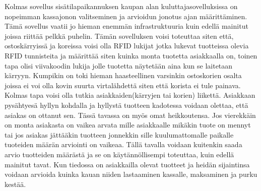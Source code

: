 Kolmas sovellus sisätilapaikannuksen kaupan alan kuluttajasovelluksissa on nopeimman kassajonon valitseminen ja arvioidun jonotus ajan määrittäminen. Tämä sovellus vaatii jo hieman enemmän infrastruktuuria kuin edellä mainitut joissa riittää pelkkä puhelin. Tämän sovelluksen voisi toteuttaa siten että, ostoskärryissä ja koreissa voisi olla RFID lukijat jotka lukevat tuotteissa olevia RFID tunnisteita ja määrittää siten kuinka monta tuotetta asiakkaalla on, toinen tapa olisi viivakoodin lukija jolle tuotetta näytetään aina kun se laitetaan kärryyn. Kumpikin on toki hieman haasteellinen varsinkin ostoskorien osalta joissa ei voi olla kovin suurta virtalähdettä siten että korista ei tule painava. Kolmas tapa voisi olla tutkia asiakkaiden(kärryjen tai korien) liikettä. Asiakkaan pysähtyesä hyllyn kohdalla ja hyllystä tuotteen kadotessa voidaan olettaa, että asiakas on ottanut sen. Tässä tavassa on myös omat heikkoutensa. Jos vierekkäin on monta asiakasta on vaikea arvata mille asiakkaalle mikäkin tuote on mennyt tai jos asiakas jättääkin tuotteen jonnekkin sille kuulumattomalle paikalle tuoteiden määrän arviointi on vaikeaa. Tällä tavalla voidaan kuitenkin saada arvio tuotteiden määrästä ja se on käytännöllisempi toteuttaa, kuin edellä mainitut tavat. Kun tiedossa on asiakkailla olevat tuotteet ja heidän sijaintinsa voidaan arvioida kuinka kauan niiden lastaaminen kassalle, maksaminen ja purku kestää.
  
